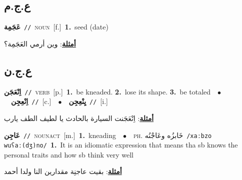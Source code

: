 \documentclass[10pt,a4paper,twoside]{article} %
\begin{document}
\begin{multicols}{2}
\vspace{-3mm}
\subsection*{\color{blue}\foreignlanguage{arabic}{ع.ج.م}\color{blue}{}} 

{\setlength\topsep{0pt}\textbf{\foreignlanguage{arabic}{عَجَمِة}}\ {\color{gray}\texttt{//}\color{black}}\ \textsc{noun}\ [f.]\ \textbf{1.}~seed (date)\  \begin{flushright}\color{gray}\foreignlanguage{arabic}{\textbf{\underline{\foreignlanguage{arabic}{أمثلة}}}: وين أرمي العَجَمِة؟}\end{flushright}\color{black}} \vspace{2mm}

\vspace{-3mm}
\subsection*{\color{blue}\foreignlanguage{arabic}{ع.ج.ن}\color{blue}{}} 

{\setlength\topsep{0pt}\textbf{\foreignlanguage{arabic}{اِنْعَجَن}}\ {\color{gray}\texttt{//}\color{black}}\ \textsc{verb}\ [p.]\ \textbf{1.}~be kneaded.  \textbf{2.}~lose its shape.  \textbf{3.}~be totaled\ \ $\bullet$\ \ \setlength\topsep{0pt}\textbf{\foreignlanguage{arabic}{اِنْعِجِن}}\ {\color{gray}\texttt{//}\color{black}}\ [c.]\ \ $\bullet$\ \ \setlength\topsep{0pt}\textbf{\foreignlanguage{arabic}{يِنْعِجِن}}\ {\color{gray}\texttt{//}\color{black}}\ [i.]\  \begin{flushright}\color{gray}\foreignlanguage{arabic}{\textbf{\underline{\foreignlanguage{arabic}{أمثلة}}}: اِنْعَجَنت السيارة بالحادث يا لطيف الطف يارب}\end{flushright}\color{black}} \vspace{2mm}

{\setlength\topsep{0pt}\textbf{\foreignlanguage{arabic}{عَاجِن}}\ {\color{gray}\texttt{//}\color{black}}\ \textsc{noun\textunderscore act}\ [m.]\ \textbf{1.}~kneading\ \ $\bullet$\ \ \textsc{ph.} \color{gray} \foreignlanguage{arabic}{خَابزُه وعَاجْنُه}\color{black}\ {\color{gray}\texttt{/{\sffamily xaːbzo wuʕaː(dʒ)no}/}\color{black}}\ \textbf{1.}~It is an idiomatic expression that means tha sb knows the personal traits and how sb think very well\  \begin{flushright}\color{gray}\foreignlanguage{arabic}{\textbf{\underline{\foreignlanguage{arabic}{أمثلة}}}: بقيت عاجنِة مقدارين النا ولدا أحمد}\end{flushright}\color{black}} \vspace{2mm}


\end{multicols}
\end{document}
